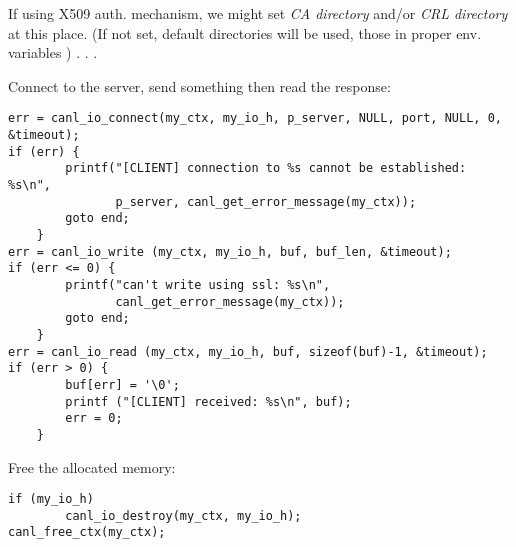 If using X509 auth. mechanism, we might set \textit{CA directory} and/or
 \textit{CRL directory} at this place. (If not set, default directories
will be used, \ie those in proper env. variables )
.
.
.

Connect to the server, send something then read the response:

\begin{lstlisting}
err = canl_io_connect(my_ctx, my_io_h, p_server, NULL, port, NULL, 0, &timeout);
if (err) {
        printf("[CLIENT] connection to %s cannot be established: %s\n",
               p_server, canl_get_error_message(my_ctx));
        goto end;
    }
err = canl_io_write (my_ctx, my_io_h, buf, buf_len, &timeout);
if (err <= 0) {
        printf("can't write using ssl: %s\n",
               canl_get_error_message(my_ctx));
        goto end;
    }
err = canl_io_read (my_ctx, my_io_h, buf, sizeof(buf)-1, &timeout);
if (err > 0) {
        buf[err] = '\0';
        printf ("[CLIENT] received: %s\n", buf);
        err = 0;
    }
\end{lstlisting}

Free the allocated memory:

\begin{lstlisting}
if (my_io_h)
        canl_io_destroy(my_ctx, my_io_h);
canl_free_ctx(my_ctx);
\end{lstlisting}

